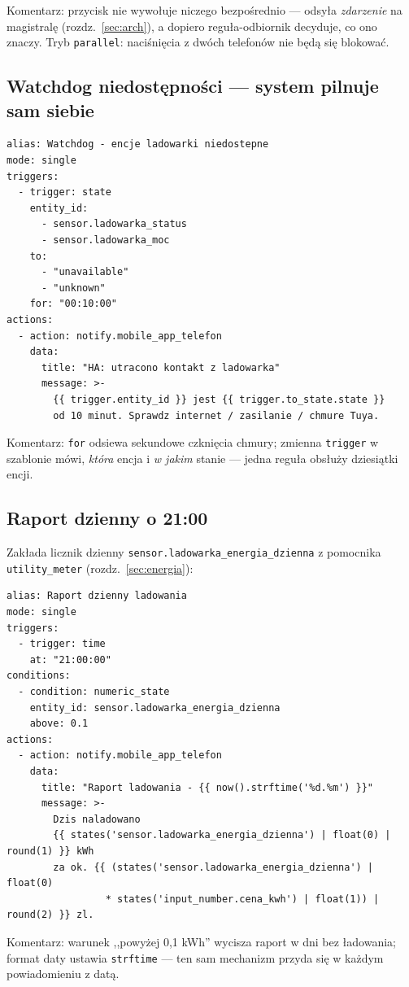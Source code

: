 \documentclass[11pt,a4paper]{article}
\begin{document}
Komentarz: przycisk nie wywołuje niczego bezpośrednio --- odsyła \emph{zdarzenie} na magistralę (rozdz.~\ref{sec:arch}), a dopiero reguła-odbiornik decyduje, co ono znaczy. Tryb \texttt{parallel}: naciśnięcia z dwóch telefonów nie będą się blokować.

\subsection{Watchdog niedostępności --- system pilnuje sam siebie}

\begin{lstlisting}
alias: Watchdog - encje ladowarki niedostepne
mode: single
triggers:
  - trigger: state
    entity_id:
      - sensor.ladowarka_status
      - sensor.ladowarka_moc
    to:
      - "unavailable"
      - "unknown"
    for: "00:10:00"
actions:
  - action: notify.mobile_app_telefon
    data:
      title: "HA: utracono kontakt z ladowarka"
      message: >-
        {{ trigger.entity_id }} jest {{ trigger.to_state.state }}
        od 10 minut. Sprawdz internet / zasilanie / chmure Tuya.
\end{lstlisting}

Komentarz: \texttt{for} odsiewa sekundowe czknięcia chmury; zmienna \texttt{trigger} w szablonie mówi, \emph{która} encja i \emph{w jakim} stanie --- jedna reguła obsłuży dziesiątki encji.

\subsection{Raport dzienny o 21:00}

Zakłada licznik dzienny \texttt{sensor.ladowarka\_energia\_dzienna} z pomocnika \texttt{utility\_meter} (rozdz.~\ref{sec:energia}):

\begin{lstlisting}
alias: Raport dzienny ladowania
mode: single
triggers:
  - trigger: time
    at: "21:00:00"
conditions:
  - condition: numeric_state
    entity_id: sensor.ladowarka_energia_dzienna
    above: 0.1
actions:
  - action: notify.mobile_app_telefon
    data:
      title: "Raport ladowania - {{ now().strftime('%d.%m') }}"
      message: >-
        Dzis naladowano
        {{ states('sensor.ladowarka_energia_dzienna') | float(0) | round(1) }} kWh
        za ok. {{ (states('sensor.ladowarka_energia_dzienna') | float(0)
                 * states('input_number.cena_kwh') | float(1)) | round(2) }} zl.
\end{lstlisting}

Komentarz: warunek ,,powyżej 0,1 kWh'' wycisza raport w dni bez ładowania; format daty ustawia \texttt{strftime} --- ten sam mechanizm przyda się w każdym powiadomieniu z datą.
\end{document}
